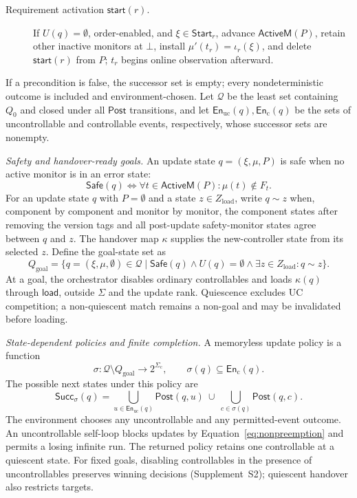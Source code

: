 \documentclass[acmsmall,screen,review,anonymous]{acmart}
\newcommand{\Post}{\mathsf{Post}}
\newcommand{\Safe}{\mathsf{Safe}}
\newcommand{\Goal}{Q_{\mathrm{goal}}}
\newcommand{\ActT}{\mathsf{ActiveM}}
\newcommand{\SuccSet}{\mathsf{Succ}}
\newcommand{\En}{\mathsf{En}}
\newcommand{\Sigmac}{\Sigma_{\mathrm{c}}}
\newcommand{\ustart}[1]{\mathsf{start}(#1)}
\begin{document}
\begin{definition}
\begin{description}
  \item[Requirement activation $\ustart{r}$.]
  If $U(q)=\emptyset$, order-enabled, and $\xi\in\mathsf{Start}_r$, advance $\ActT(P)$, retain other inactive monitors at $\bot$, install $\mu'(t_r)=\iota_r(\xi)$, and delete $\ustart{r}$ from $P$; $t_r$ begins online observation afterward.
\end{description}
If a precondition is false, the successor set is empty; every nondeterministic outcome is included and environment-chosen.
Let $\mathcal Q$ be the least set containing $Q_0$ and closed under all $\Post$ transitions, and let $\En_{\mathrm{uc}}(q),\En_{\mathrm{c}}(q)$ be the sets of uncontrollable and controllable events, respectively, whose successor sets are nonempty.
\par\noindent\emph{Safety and handover-ready goals.}
\label{def:safe_goal}
An update state $q=(\xi,\mu,P)$ is safe when no active monitor is in an error state:
\[
 \Safe(q)\Longleftrightarrow
 \forall t\in\ActT(P):\mu(t)\notin F_t.
\tag{5}\label{eq:safe}
\]
For an update state $q$ with $P=\emptyset$ and a state $z\in Z_{\mathrm{load}}$, write $q\sim z$ when, component by component and monitor by monitor, the component states after removing the version tags and all post-update safety-monitor states agree between $q$ and $z$.
The handover map $\kappa$ supplies the new-controller state from its selected $z$.
Define the goal-state set as
\[
\Goal=\{q=(\xi,\mu,\emptyset)\in\mathcal Q\mid
\Safe(q)\land U(q)=\emptyset\land\exists z\in Z_{\mathrm{load}}:q\sim z\}.
\tag{6}\label{eq:goal}
\]
At a goal, the orchestrator disables ordinary controllables and loads $\kappa(q)$ through $\mathsf{load}$, outside $\Sigma$ and the update rank. Quiescence excludes UC competition; a non-quiescent match remains a non-goal and may be invalidated before loading.
\par\noindent\emph{State-dependent policies and finite completion.}
\label{def:strategy}
A memoryless update policy is a function
\[
 \sigma:\mathcal Q\setminus\Goal\longrightarrow 2^{\Sigmac},
 \qquad
 \sigma(q)\subseteq \En_{\mathrm{c}}(q).
\tag{7}\label{eq:strategy-type}
\]
The possible next states under this policy are
\[
 \SuccSet_\sigma(q)=
 \bigcup_{u\in \En_{\mathrm{uc}}(q)}\Post(q,u)
 \ \cup\
 \bigcup_{c\in\sigma(q)}\Post(q,c).
\tag{8}\label{eq:strategy-successors}
\]
The environment chooses any uncontrollable and any permitted-event outcome. An uncontrollable self-loop blocks updates by Equation~\eqref{eq:nonpreemption} and permits a losing infinite run. The returned policy retains one controllable at a quiescent state. For fixed goals, disabling controllables in the presence of uncontrollables preserves winning decisions (Supplement~S2); quiescent handover also restricts targets.


\end{definition}
\end{document}
